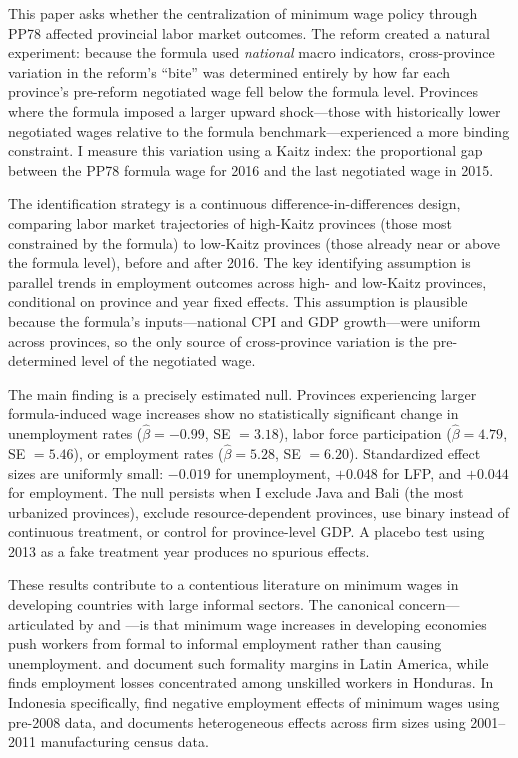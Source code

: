 \documentclass[12pt]{article}
\begin{document}
This paper asks whether the centralization of minimum wage policy through PP78 affected provincial labor market outcomes. The reform created a natural experiment: because the formula used \textit{national} macro indicators, cross-province variation in the reform's ``bite'' was determined entirely by how far each province's pre-reform negotiated wage fell below the formula level. Provinces where the formula imposed a larger upward shock---those with historically lower negotiated wages relative to the formula benchmark---experienced a more binding constraint. I measure this variation using a Kaitz index: the proportional gap between the PP78 formula wage for 2016 and the last negotiated wage in 2015.

The identification strategy is a continuous difference-in-differences design, comparing labor market trajectories of high-Kaitz provinces (those most constrained by the formula) to low-Kaitz provinces (those already near or above the formula level), before and after 2016. The key identifying assumption is parallel trends in employment outcomes across high- and low-Kaitz provinces, conditional on province and year fixed effects. This assumption is plausible because the formula's inputs---national CPI and GDP growth---were uniform across provinces, so the only source of cross-province variation is the pre-determined level of the negotiated wage.

The main finding is a precisely estimated null. Provinces experiencing larger formula-induced wage increases show no statistically significant change in unemployment rates ($\hat{\beta} = -0.99$, SE $= 3.18$), labor force participation ($\hat{\beta} = 4.79$, SE $= 5.46$), or employment rates ($\hat{\beta} = 5.28$, SE $= 6.20$). Standardized effect sizes are uniformly small: $-0.019$ for unemployment, $+0.048$ for LFP, and $+0.044$ for employment. The null persists when I exclude Java and Bali (the most urbanized provinces), exclude resource-dependent provinces, use binary instead of continuous treatment, or control for province-level GDP. A placebo test using 2013 as a fake treatment year produces no spurious effects.

These results contribute to a contentious literature on minimum wages in developing countries with large informal sectors. The canonical concern---articulated by \citet{harrison2004global} and \citet{bell1997effect}---is that minimum wage increases in developing economies push workers from formal to informal employment rather than causing unemployment. \citet{maloney2004informality} and \citet{pratap2006gender} document such formality margins in Latin America, while \citet{gindling2010minimum} finds employment losses concentrated among unskilled workers in Honduras. In Indonesia specifically, \citet{bird2008minimum} find negative employment effects of minimum wages using pre-2008 data, and \citet{del2015does} documents heterogeneous effects across firm sizes using 2001--2011 manufacturing census data.
\end{document}
